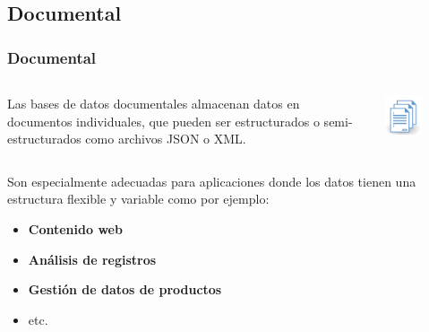 \subsection{Documental}

\begin{frame}
    \frametitle{Documental}

    \begin{columns}
        \begin{column}{0.48\textwidth}
            Las bases de datos documentales almacenan datos en documentos individuales, que pueden ser estructurados o semi-estructurados como archivos JSON o XML.
        \end{column}
        \begin{column}{0.48\textwidth}
            \centering
            \includegraphics[width=0.5\textwidth]{images/Documental.png}
        \end{column}
    \end{columns}
    
     

    \vspace{0.3cm}
    
    Son especialmente adecuadas para aplicaciones donde los datos tienen una estructura flexible y variable como por ejemplo:

     
    
    \begin{itemize}
        \item \textbf{Contenido web}  
        \item \textbf{Análisis de registros}  
        \item \textbf{Gestión de datos de productos}
        \item etc.
    \end{itemize}
\end{frame}

